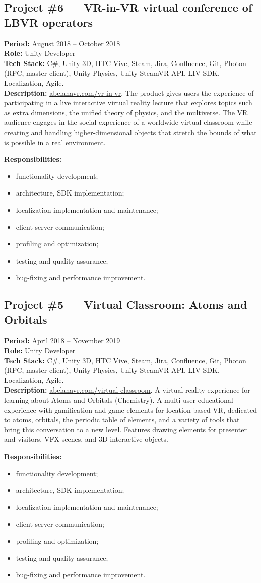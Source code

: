 \documentclass[letterpaper,11pt]{article}
\newcommand{\project}[6]{%
  \par\addvspace{20pt}%
  \noindent\begin{minipage}{\linewidth}
  \subsection*{#1}
  \textbf{Period:} #2 \\
  \textbf{Role:} #5 \\
  \textbf{Tech Stack:} #4 \\
  \textbf{Description:} #3
  \par\smallskip
  \textbf{Responsibilities:}
  \begin{itemize}[leftmargin=1.4em,itemsep=1pt,topsep=2pt,parsep=0pt]
    #6
  \end{itemize}
  \end{minipage}%
  \par\addvspace{20pt}%
}
\begin{document}
\project{Project \#6 --- VR-in-VR virtual conference of LBVR operators}
  {August 2018 -- October 2018}
  {\href{https://www.abelanavr.com/vr-in-vr}{abelanavr.com/vr-in-vr}. The product gives users the experience of participating in a live interactive virtual reality lecture that explores topics such as extra dimensions, the unified theory of physics, and the multiverse. The VR audience engages in the social experience of a worldwide virtual classroom while creating and handling higher-dimensional objects that stretch the bounds of what is possible in a real environment.}
  {C\#, Unity 3D, HTC Vive, Steam, Jira, Confluence, Git, Photon (RPC, master client), Unity Physics, Unity SteamVR API, LIV SDK, Localization, Agile.}
  {Unity Developer}
  {
    \item functionality development;
    \item architecture, SDK implementation;
    \item localization implementation and maintenance;
    \item client-server communication;
    \item profiling and optimization;
    \item testing and quality assurance;
    \item bug-fixing and performance improvement.
  }

\project{Project \#5 --- Virtual Classroom: Atoms and Orbitals}
  {April 2018 -- November 2019}
  {\href{https://www.abelanavr.com/virtual-classroom}{abelanavr.com/virtual-classroom}. A virtual reality experience for learning about Atoms and Orbitals (Chemistry). A multi-user educational experience with gamification and game elements for location-based VR, dedicated to atoms, orbitals, the periodic table of elements, and a variety of tools that bring this conversation to a new level. Features drawing elements for presenter and visitors, VFX scenes, and 3D interactive objects.}
  {C\#, Unity 3D, HTC Vive, Steam, Jira, Confluence, Git, Photon (RPC, master client), Unity Physics, Unity SteamVR API, LIV SDK, Localization, Agile.}
  {Unity Developer}
  {
    \item functionality development;
    \item architecture, SDK implementation;
    \item localization implementation and maintenance;
    \item client-server communication;
    \item profiling and optimization;
    \item testing and quality assurance;
    \item bug-fixing and performance improvement.
  }
\end{document}
